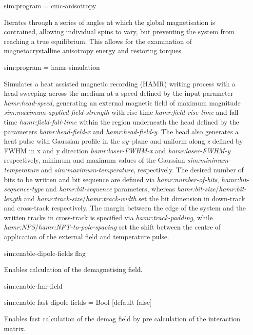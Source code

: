 {\zicf sim:program = cmc-anisotropy} Iterates through a series of angles at which the global magnetisation is contrained, allowing individual spins to vary, but preventing the system from reaching a true equilibrium. This allows for the examination of magnetocrystalline anisotropy energy and restoring torques.

{\zicf sim:program = hamr-simulation}
Simulates a heat assisted magnetic recording (HAMR) writing process with a head sweeping across the medium at a speed
defined by the input parameter \textit{hamr:head-speed}, generating an external magnetic field of maximum magnitude
\textit{sim:maximum-applied-field-strength} with rise time \textit{hamr:field-rise-time} and fall time \textit{hamr:field-fall-time}
within the region underneath the head defined by the parameters \textit{hamr:head-field-x} and \textit{hamr:head-field-y}.
The head also generates a heat pulse with Gaussian profile in the \textit{xy}--plane and uniform along \textit{z}  
defined by FWHM in x and y direction \textit{hamr:laser-FWHM-x} and \textit{hamr:laser-FWHM-y} respectively, 
minimum and maximum values of the Gaussian \textit{sim:minimum-temperature} and \textit{sim:maximum-temperature}, respectively.
The desired number of bits to be written and bit sequence are defined via
\textit{hamr:number-of-bits}, \textit{hamr:bit-sequence-type} and \textit{hamr:bit-sequence} parameters, whereas
\textit{hamr:bit-size}/\textit{hamr:bit-length} and \textit{hamr:track-size}/\textit{hamr:track-width} set the bit
dimension in down-track and cross-track respectively. 
The margin between the edge of the system and the written tracks in cross-track is specified via 
\textit{hamr:track-padding}, while \textit{hamr:NPS}/\textit{hamr:NFT-to-pole-spacing}
set the shift between the centre of application of the external field and temperature pulse.

{\zicf sim:enable-dipole-fields flag} Enables calculation of the demagnetising field.

{\zicf sim:enable-fmr-field}

{\zicf sim:enable-fast-dipole-fields = Bool [default false]} Enables fast calculation of the demag field by pre calculation of the interaction matrix.


